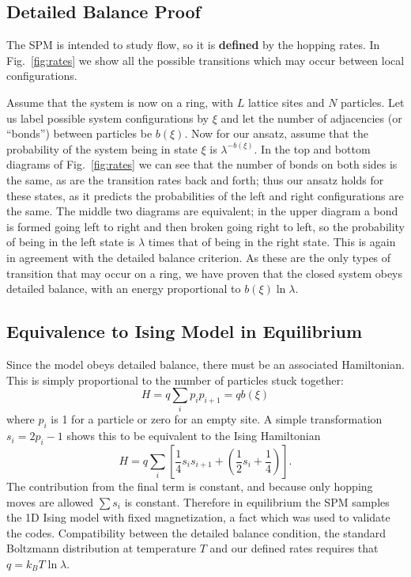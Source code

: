 \documentclass[
reprint, amsmath,amssymb, aps,
 prx,
]{revtex4-1}
\begin{document}
\subsection{Detailed Balance Proof} 
The SPM is intended to study flow, so it is {\bf defined} by the
hopping rates.  In Fig.~\ref{fig:rates} we
show all the possible transitions which may occur between local
configurations. 

Assume that the system is now on a ring, with $L$
lattice sites and $N$ particles.  Let us label possible system
configurations by $\xi$ and let the number of adjacencies (or
``bonds'') between particles be $b(\xi)$. Now for our ansatz, assume
that the probability of the system being in state $\xi$ is
$\lambda^{-b(\xi)}$.  In the top and bottom diagrams of
Fig.~\ref{fig:rates} we can see that the number of bonds on
both sides is the same, as are the transition rates back and forth;
thus our ansatz holds for these states, as it predicts the
probabilities of the left and right configurations are the same. The
middle two diagrams are equivalent; in the upper diagram a
bond is formed going left to right and then broken going right to
left, so the probability of being in the left state is $\lambda$ times
that of being in the right state. This is again in agreement with the
detailed balance criterion. As these are the only types of transition
that may occur on a ring, we have proven that the closed system obeys
detailed balance, with an energy proportional to $b(\xi) \ln {\lambda}$.

\subsection{Equivalence to Ising Model in Equilibrium}

Since the model obeys detailed balance, there must be an associated
Hamiltonian.  This is simply proportional to the number of particles stuck together:
\begin{equation}
 H = q \sum_i p_ip_{i+1} = q b(\xi)
\end{equation}
where $p_i$ is 1 for a particle or zero for an empty site.  A simple
transformation $s_i = 2p_i-1$ shows this to be equivalent to the Ising
Hamiltonian
\begin{equation}
 H = q \sum_i \left[ \frac{1}{4} s_i s_{i+1} + \left( \frac{1}{2} s_i + \frac{1}{4} \right) \right].
\end{equation}
The contribution from the final term is constant, and because only hopping moves are allowed
$\sum s_i$ is constant\cite{PhysRev.145.224}. 
Therefore in equilibrium the SPM samples the 1D
Ising model with fixed magnetization, a fact which was used to
validate the codes. Compatibility between the detailed balance condition, the standard Boltzmann distribution at temperature $T$ and our defined rates requires that $q = k_B T\ln{\lambda} $.
\end{document}
